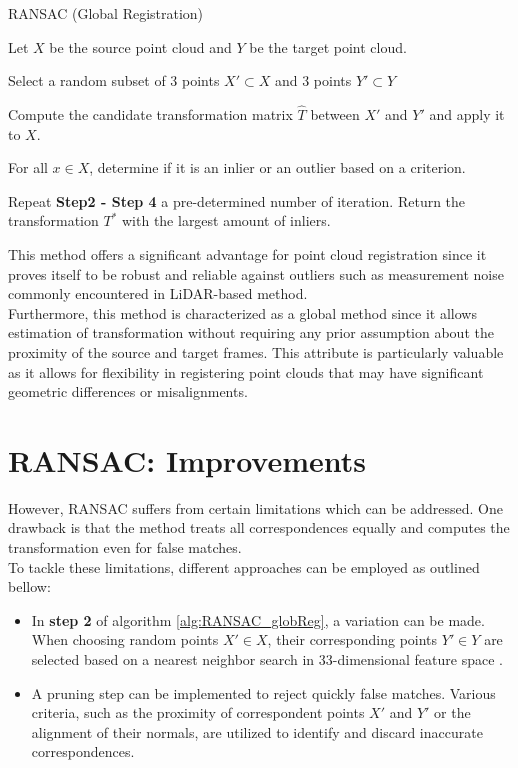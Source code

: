 \begin{algorithm}[H]
\caption{RANSAC (Global Registration)}\label{alg:RANSAC_globReg}
\begin{description}[leftmargin=!, labelwidth=\widthof{\textbf{Step1: }}]
    \item [Step 1:] Let $X$ be the source point cloud and $Y$ be the target point cloud.
    \item [Step 2:] Select a random subset of 3 points $X' \subset X$ and 3 points $Y' \subset Y$
    \item [Step 3:] Compute the candidate transformation matrix $\hat{{T}}$ between $X'$ and $Y'$ and apply it to $X$.
    \item [Step 4:] For all $x \in X$, determine if it is an inlier or an outlier based on a criterion.
    \item [Step 5:] Repeat \textbf{Step2 - Step 4} a pre-determined number of iteration. Return the transformation $T^*$ with the largest amount of inliers.
\end{description}
\end{algorithm}
This method offers a significant advantage for point cloud registration since it proves itself to be robust and reliable against outliers such as measurement noise commonly encountered in LiDAR-based method.\\
Furthermore, this method is characterized as a global method since it allows estimation of transformation without requiring any prior assumption about the proximity of the source and target frames. This attribute is particularly valuable as it allows for flexibility in registering point clouds that may have significant geometric differences or misalignments.\\

\section{RANSAC: Improvements \label{sec:RANSAC_improvements}}
However, RANSAC suffers from certain limitations which can be addressed. One drawback is that the method treats all correspondences equally and computes the transformation even for false matches.\\
To tackle these limitations, different approaches can be employed as outlined bellow:
\begin{itemize}
    \item In \textbf{step 2} of algorithm \ref{alg:RANSAC_globReg}, a variation can be made. When choosing random points $X' \in X$, their corresponding points $Y' \in Y$ are selected based on a nearest neighbor search in 33-dimensional feature space \cite{33FPFH}. 
    \item A pruning step can be implemented to reject quickly false matches. Various criteria, such as the proximity of correspondent points $X'$ and $Y'$ or the alignment of their normals, are utilized to identify and discard inaccurate correspondences\cite{RANSAC_pruning}\cite{Open3D}. 
\end{itemize}



